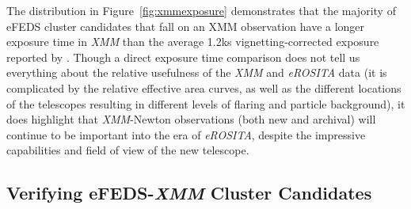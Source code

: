\documentclass[fleqn,usenatbib]{mnras}
\begin{document}

The distribution in Figure~\ref{fig:xmmexposure} demonstrates that the majority of eFEDS cluster candidates that fall on an XMM observation have a longer exposure time in {\em XMM} than the average 1.2ks vignetting-corrected exposure reported by \cite{efedsclustercat}. Though a direct exposure time comparison does not tell us everything about the relative usefulness of the {\em XMM} and {\em eROSITA} data (it is complicated by the relative effective area curves, as well as the different locations of the telescopes resulting in different levels of flaring and particle background), it does highlight that {\em XMM}-Newton observations (both new and archival) will continue to be important into the era of {\em eROSITA}, despite the impressive capabilities and field of view of the new telescope. 


\subsection{Verifying eFEDS-{\em XMM} Cluster Candidates}


\end{document}

